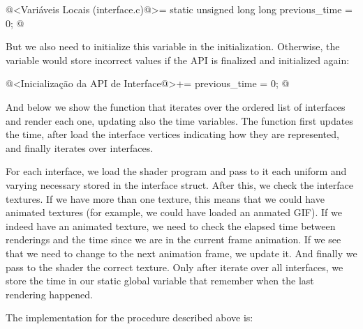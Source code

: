 \iniciocodigo
@<Variáveis Locais (interface.c)@>=
static unsigned long long previous_time = 0;
@
\fimcodigo

But we also need to initialize this variable in the
initialization. Otherwise, the variable would store incorrect values
if the API is finalized and initialized again:

\iniciocodigo
@<Inicialização da API de Interface@>+=
previous_time = 0;
@
\fimcodigo

And below we show the function that iterates over the ordered list of
interfaces and render each one, updating also the time variables. The
function first updates the time, after load the interface vertices
indicating how they are represented, and finally iterates over
interfaces.

For each interface, we load the shader program and pass to it each
uniform and varying necessary stored in the interface struct. After
this, we check the interface textures. If we have more than one
texture, this means that we could have animated textures (for example,
we could have loaded an anmated GIF). If we indeed have an animated
texture, we need to check the elapsed time between renderings and the
time since we are in the current frame animation. If we see that we
need to change to the next animation frame, we update it. And finally
we pass to the shader the correct texture. Only after iterate over all
interfaces, we store the time in our static global variable that
remember when the last rendering happened.

The implementation for the procedure described above is:

